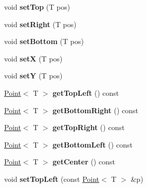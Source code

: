 \begin{DoxyCompactItemize}
\item 
\hypertarget{class_box_a9e5e2f4b7268a52906ebd441a79d5bdd}{
void {\bfseries setTop} (T pos)}
\label{class_box_a9e5e2f4b7268a52906ebd441a79d5bdd}

\item 
\hypertarget{class_box_a037ab25102c5bf2d050282ed35d6a312}{
void {\bfseries setRight} (T pos)}
\label{class_box_a037ab25102c5bf2d050282ed35d6a312}

\item 
\hypertarget{class_box_ac5d43338470ef5bfab770786b170f454}{
void {\bfseries setBottom} (T pos)}
\label{class_box_ac5d43338470ef5bfab770786b170f454}

\item 
\hypertarget{class_box_a4dcb975c536439998d7f6c0fc47b2358}{
void {\bfseries setX} (T pos)}
\label{class_box_a4dcb975c536439998d7f6c0fc47b2358}

\item 
\hypertarget{class_box_a976594b18e7c135903607265a14ba783}{
void {\bfseries setY} (T pos)}
\label{class_box_a976594b18e7c135903607265a14ba783}

\item 
\hypertarget{class_box_ac0f698d9054c81ce3f0b9e45b208aa83}{
\hyperlink{class_point}{Point}$<$ T $>$ {\bfseries getTopLeft} () const }
\label{class_box_ac0f698d9054c81ce3f0b9e45b208aa83}

\item 
\hypertarget{class_box_a1cbff4ee05e798b43cda5ca603d004e7}{
\hyperlink{class_point}{Point}$<$ T $>$ {\bfseries getBottomRight} () const }
\label{class_box_a1cbff4ee05e798b43cda5ca603d004e7}

\item 
\hypertarget{class_box_a61afdde64f205f189aeff219bac2db24}{
\hyperlink{class_point}{Point}$<$ T $>$ {\bfseries getTopRight} () const }
\label{class_box_a61afdde64f205f189aeff219bac2db24}

\item 
\hypertarget{class_box_a0e7e1c5254740268ba77c9a0b27a4f06}{
\hyperlink{class_point}{Point}$<$ T $>$ {\bfseries getBottomLeft} () const }
\label{class_box_a0e7e1c5254740268ba77c9a0b27a4f06}

\item 
\hypertarget{class_box_a79994cde311637abfa037fed82144376}{
\hyperlink{class_point}{Point}$<$ T $>$ {\bfseries getCenter} () const }
\label{class_box_a79994cde311637abfa037fed82144376}

\item 
\hypertarget{class_box_ae155e4095a60d21cdd3677e018ef25c9}{
void {\bfseries setTopLeft} (const \hyperlink{class_point}{Point}$<$ T $>$ \&p)}
\label{class_box_ae155e4095a60d21cdd3677e018ef25c9}


\end{DoxyCompactItemize}
